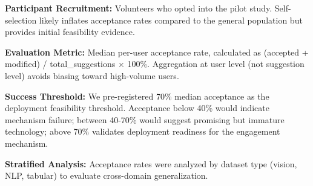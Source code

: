 \textbf{Participant Recruitment:} Volunteers who opted into the pilot study. Self-selection likely inflates acceptance rates compared to the general population but provides initial feasibility evidence.

\textbf{Evaluation Metric:} Median per-user acceptance rate, calculated as (accepted + modified) / total_suggestions × 100\%. Aggregation at user level (not suggestion level) avoids biasing toward high-volume users.

\textbf{Success Threshold:} We pre-registered 70\% median acceptance as the deployment feasibility threshold. Acceptance below 40\% would indicate mechanism failure; between 40-70\% would suggest promising but immature technology; above 70\% validates deployment readiness for the engagement mechanism.

\textbf{Stratified Analysis:} Acceptance rates were analyzed by dataset type (vision, NLP, tabular) to evaluate cross-domain generalization.
